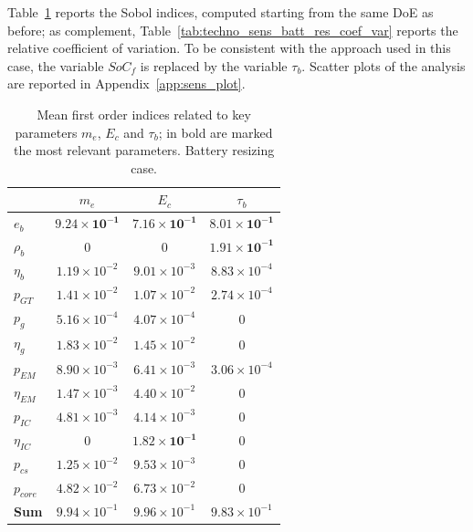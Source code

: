 Table~\ref{tab:techno_sens_batt_res_mean} reports the Sobol indices, computed starting from the same DoE as before; as complement, Table~\ref{tab:techno_sens_batt_res_coef_var} reports the relative coefficient of variation. 
To be consistent with the approach used in this case, the variable $SoC_f$ is replaced by the variable $\tau_{b}$.
Scatter plots of the analysis are reported in Appendix~\ref{app:sens_plot}. 
\begin{table}[!h]
	\centering
	\begin{tabular}{l c c c}
		\cline{2-4} 
		&  $m_e$ & $E_c$ & $\tau_{b}$ \\
		\hline
		$e_b$ & $\mathbf{9.24\times10^{-1}}$ & $\mathbf{7.16\times10^{-1}}$ & $\mathbf{8.01\times10^{-1}}$  \\
		$\rho_b$ & 0 & 0 & $\mathbf{1.91\times10^{-1}}$ \\
		$\eta_b$ & $1.19\times10^{-2}$ & $9.01\times10^{-3}$ & $8.83\times10^{-4}$ \\
		
		$p_{GT}$ & $1.41\times10^{-2}$ & $1.07\times10^{-2}$ & $2.74\times10^{-4}$ \\
		$p_g$ & $5.16\times10^{-4}$ & $4.07\times10^{-4}$ & 0 \\
		$\eta_g$ & $1.83\times10^{-2}$ & $1.45\times10^{-2}$ & 0 \\
		
		$p_{EM}$ & $8.90\times10^{-3}$ & $6.41\times10^{-3}$ & $3.06\times10^{-4}$ \\
		$\eta_{EM}$ & $1.47\times10^{-3}$ & $4.40\times10^{-2}$ & 0\\
		
		$p_{IC}$ & $4.81\times10^{-3}$ & $4.14\times10^{-3}$ & 0 \\
		$\eta_{IC}$ & 0 & $\mathbf{1.82\times10^{-1}}$ & 0 \\
		
		$p_{cs}$ & $1.25\times10^{-2}$ & $9.53\times10^{-3}$ & 0\\
		
		$p_{core}$ & $4.82\times10^{-2}$ & $6.73\times10^{-2}$ & 0\\		
		\hline
		\textbf{Sum} & $9.94\times10^{-1}$ & $9.96\times10^{-1}$ & $9.83\times10^{-1}$ \\
		\hline
	\end{tabular}
	\caption{Mean first order indices related to key parameters $m_e$, $E_c$ and $\tau_{b}$; in bold are marked the most relevant parameters. Battery resizing case.}
	\label{tab:techno_sens_batt_res_mean}
\end{table}  
